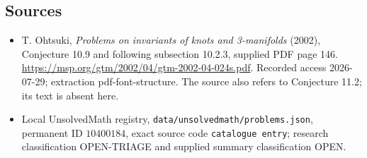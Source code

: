 \documentclass[11pt]{article}
\begin{document}
\subsection{Sources}
\begin{itemize}
\item T. Ohtsuki, \emph{Problems on invariants of knots and 3-manifolds} (2002), Conjecture 10.9 and following subsection 10.2.3, supplied PDF page 146. \url{https://msp.org/gtm/2002/04/gtm-2002-04-024s.pdf}. Recorded access 2026-07-29; extraction pdf-font-structure. The source also refers to Conjecture 11.2; its text is absent here.
\item Local UnsolvedMath registry, \texttt{data/unsolvedmath/problems.json}, permanent ID \(10400184\), exact source code \texttt{catalogue entry}; research classification OPEN-TRIAGE and supplied summary classification OPEN.
\end{itemize}
\end{document}
